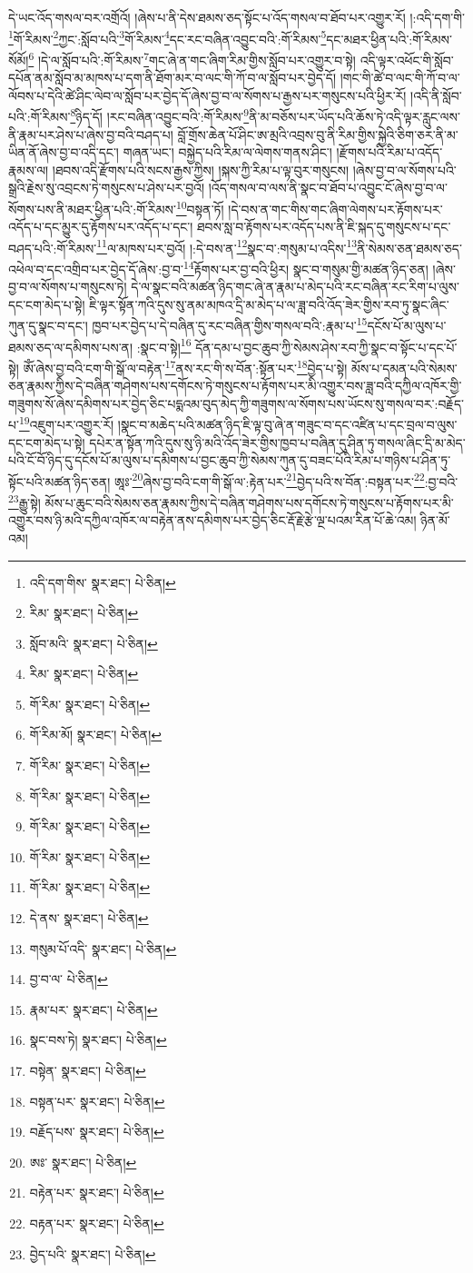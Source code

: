 དེ་ཡང་འོད་གསལ་བར་འགྲོའོ། །ཞེས་པ་ནི་དེས་ཐམས་ཅད་སྟོང་པ་འོད་གསལ་བ་ཐོབ་པར་འགྱུར་རོ། །:འདི་དག་གི་\footnote{འདི་དག་གིས་  སྣར་ཐང་།  པེ་ཅིན། }གོ་རིམས་\footnote{རིམ་  སྣར་ཐང་།  པེ་ཅིན། }ཀྱང་:སློབ་པའི་\footnote{སློབ་མའི་  སྣར་ཐང་།  པེ་ཅིན། }གོ་རིམས་\footnote{རིམ་  སྣར་ཐང་།  པེ་ཅིན། }དང་རང་བཞིན་འབྱུང་བའི་:གོ་རིམས་\footnote{གོ་རིམ་  སྣར་ཐང་།  པེ་ཅིན། }དང་མཐར་ཕྱིན་པའི་:གོ་རིམས་སོམོ།\footnote{གོ་རིམ་མོ།  སྣར་ཐང་།  པེ་ཅིན། } །དེ་ལ་སློབ་པའི་:གོ་རིམས་\footnote{གོ་རིམ་  སྣར་ཐང་།  པེ་ཅིན། }གང་ཞེ་ན་གང་ཞིག་རིམ་གྱིས་སློབ་པར་འགྱུར་བ་སྟེ། འདི་ལྟར་འཕོང་གི་སློབ་དཔོན་ནམ་སློབ་མ་མཁས་པ་དག་ནི་ཐོག་མར་བ་ལང་གི་ཀོ་བ་ལ་སློབ་པར་བྱེད་དོ། །གང་གི་ཚེ་བ་ལང་གི་ཀོ་བ་ལ་ལོབས་པ་དེའི་ཚེ་ཤིང་ལེབ་ལ་སློབ་པར་བྱེད་དོ་ཞེས་བྱ་བ་ལ་སོགས་པ་རྒྱས་པར་གསུངས་པའི་ཕྱིར་རོ། །འདི་ནི་སློབ་པའི་:གོ་རིམས་\footnote{གོ་རིམ་  སྣར་ཐང་།  པེ་ཅིན། }ཉིད་དོ། །རང་བཞིན་འབྱུང་བའི་:གོ་རིམས་\footnote{གོ་རིམ་  སྣར་ཐང་།  པེ་ཅིན། }ནི་མ་བཅོས་པར་ཡོད་པའི་ཆོས་ཏེ་འདི་ལྟར་རླུང་ལས་ནི་རྣམ་པར་ཤེས་པ་ཞེས་བྱ་བའི་བཤད་པ། བློ་གྲོས་ཆེན་པོ་ཤིང་ཨ་མྲའི་འབྲས་བུ་ནི་རིམ་གྱིས་སྐྱེའི་ཅིག་ཅར་ནི་མ་ཡིན་ནོ་ཞེས་བྱ་བ་འདི་དང་། གཞན་ཡང་། བསྐྱེད་པའི་རིམ་ལ་ལེགས་གནས་ཤིང་། །རྫོགས་པའི་རིམ་པ་འདོད་རྣམས་ལ། །ཐབས་འདི་རྫོགས་པའི་སངས་རྒྱས་ཀྱིས། །སྐས་ཀྱི་རིམ་པ་ལྟ་བུར་གསུངས། །ཞེས་བྱ་བ་ལ་སོགས་པའི་སྒྲའི་རྗེས་སུ་འབྲངས་ཏེ་གསུངས་པ་ཤེས་པར་བྱའོ། །འོད་གསལ་བ་ལས་ནི་སྣང་བ་ཐོབ་པ་འབྱུང་ངོ་ཞེས་བྱ་བ་ལ་སོགས་པས་ནི་མཐར་ཕྱིན་པའི་:གོ་རིམས་\footnote{གོ་རིམ་  སྣར་ཐང་།  པེ་ཅིན། }བསྟན་ཏོ། །དེ་བས་ན་གང་གིས་གང་ཞིག་ལེགས་པར་རྟོགས་པར་འདོད་པ་དང་མྱུར་དུ་རྟོགས་པར་འདོད་པ་དང་། ཐབས་སླ་བ་རྟོགས་པར་འདོད་པས་ནི་ཇི་སྐད་དུ་གསུངས་པ་དང་བཤད་པའི་:གོ་རིམས་\footnote{གོ་རིམ་  སྣར་ཐང་།  པེ་ཅིན། }ལ་མཁས་པར་བྱའོ། །:དེ་བས་ན་\footnote{དེ་ནས་  སྣར་ཐང་།  པེ་ཅིན། }སྣང་བ་:གསུམ་པ་འདིས་\footnote{གསུམ་པོ་འདི་  སྣར་ཐང་།  པེ་ཅིན། }ནི་སེམས་ཅན་ཐམས་ཅད་འཕེལ་བ་དང་འགྲིབ་པར་བྱེད་དོ་ཞེས་:བྱ་བ་\footnote{བྱ་བ་ལ་  པེ་ཅིན། }རྟོགས་པར་བྱ་བའི་ཕྱིར། སྣང་བ་གསུམ་གྱི་མཚན་ཉིད་ཅན། །ཞེས་བྱ་བ་ལ་སོགས་པ་གསུངས་ཏེ། དེ་ལ་སྣང་བའི་མཚན་ཉིད་གང་ཞེ་ན་རྣམ་པ་མེད་པའི་རང་བཞིན་རང་རིག་པ་ལུས་དང་ངག་མེད་པ་སྟེ། ཇི་ལྟར་སྟོན་ཀའི་དུས་སུ་ནམ་མཁའ་དྲི་མ་མེད་པ་ལ་ཟླ་བའི་འོད་ཟེར་གྱིས་རབ་ཏུ་སྣང་ཞིང་ཀུན་དུ་སྣང་བ་དང་། ཁྱབ་པར་བྱེད་པ་དེ་བཞིན་དུ་རང་བཞིན་གྱིས་གསལ་བའི་:རྣམ་པ་\footnote{རྣམ་པར་  སྣར་ཐང་།  པེ་ཅིན། }དངོས་པོ་མ་ལུས་པ་ཐམས་ཅད་ལ་དམིགས་པས་ན། :སྣང་བ་སྟེ།\footnote{སྣང་བས་ཏེ།  སྣར་ཐང་།  པེ་ཅིན། } དོན་དམ་པ་བྱང་ཆུབ་ཀྱི་སེམས་ཤེས་རབ་ཀྱི་སྣང་བ་སྟོང་པ་དང་པོ་སྟེ། ཨོཾ་ཞེས་བྱ་བའི་ངག་གི་སྒོ་ལ་བརྟེན་\footnote{བསྟེན་  སྣར་ཐང་།  པེ་ཅིན། }ནས་རང་གི་ས་བོན་:སྟོན་པར་\footnote{བསྟན་པར་  སྣར་ཐང་།  པེ་ཅིན། }བྱེད་པ་སྟེ། མོས་པ་དམན་པའི་སེམས་ཅན་རྣམས་ཀྱིས་དེ་བཞིན་གཤེགས་པས་དགོངས་ཏེ་གསུངས་པ་རྟོགས་པར་མི་འགྱུར་བས་ཟླ་བའི་དཀྱིལ་འཁོར་གྱི་གཟུགས་སོ་ཞེས་དམིགས་པར་བྱེད་ཅིང་པདྨའམ་བུད་མེད་ཀྱི་གཟུགས་ལ་སོགས་པས་ཡོངས་སུ་གསལ་བར་:བརྗོད་པ་\footnote{བརྗོད་པས་  སྣར་ཐང་།  པེ་ཅིན། }འཇུག་པར་འགྱུར་རོ། །སྣང་བ་མཆེད་པའི་མཚན་ཉིད་ཇི་ལྟ་བུ་ཞེ་ན་གཟུང་བ་དང་འཛིན་པ་དང་བྲལ་བ་ལུས་དང་ངག་མེད་པ་སྟེ། དཔེར་ན་སྟོན་ཀའི་དུས་སུ་ཉི་མའི་འོད་ཟེར་གྱིས་ཁྱབ་པ་བཞིན་དུ་ཤིན་ཏུ་གསལ་ཞིང་དྲི་མ་མེད་པའི་ངོ་བོ་ཉིད་དུ་དངོས་པོ་མ་ལུས་པ་དམིགས་པ་བྱང་ཆུབ་ཀྱི་སེམས་ཀུན་དུ་བཟང་པོའི་རིམ་པ་གཉིས་པ་ཤིན་ཏུ་སྟོང་པའི་མཚན་ཉིད་ཅན། ཨཱཿ་\footnote{ཨཿ་  སྣར་ཐང་།  པེ་ཅིན། }ཞེས་བྱ་བའི་ངག་གི་སྒོ་ལ་:རྟེན་པར་\footnote{བརྟེན་པར་  སྣར་ཐང་།  པེ་ཅིན། }བྱེད་པའི་ས་བོན་:བསྟན་པར་\footnote{བརྟན་པར་  སྣར་ཐང་།  པེ་ཅིན། }:བྱ་བའི་\footnote{བྱེད་པའི་  སྣར་ཐང་།  པེ་ཅིན། }རྒྱུ་སྟེ། མོས་པ་ཆུང་བའི་སེམས་ཅན་རྣམས་ཀྱིས་དེ་བཞིན་གཤེགས་པས་དགོངས་ཏེ་གསུངས་པ་རྟོགས་པར་མི་འགྱུར་བས་ཉི་མའི་དཀྱིལ་འཁོར་ལ་བརྟེན་ནས་དམིགས་པར་བྱེད་ཅིང་རྡོ་རྗེ་རྩེ་ལྔ་པའམ་རིན་པོ་ཆེ་འམ། ཉིན་མོ་འམ། 